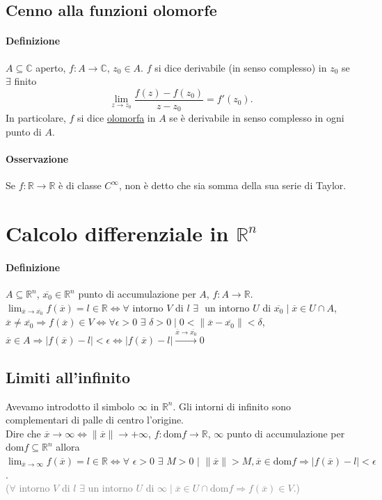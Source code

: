 \documentclass{article}
\newcommand{\R}{\mathbb{R}}
\newcommand{\C}{\mathbb{C}}
\newcommand{\dom}{\text{dom}}
\begin{document}
\subsection{{Cenno alla funzioni olomorfe}}

\paragraph{{Definizione}}
$A \subseteq \C$ aperto, $f:A\rightarrow \C$, $z_0\in A$. $f$ si dice derivabile (in senso complesso) in $z_0$ se $\exists$ finito 
\begin{equation*}
    \lim_{z \rightarrow z_0} \frac{f(z)-f(z_0)}{z-z_0}=f'(z_0).
\end{equation*}
In particolare, $f$ si dice \underline{olomorfa} in $A$ se è derivabile in senso complesso in ogni punto di $A$.

\paragraph{{Osservazione}}
Se $f:\R\rightarrow\R$ è di classe $C^\infty$, non è detto che sia somma della sua serie di Taylor.

\section{\Large\textbf{Calcolo differenziale in $\R^n$}}
\paragraph{Definizione}
$A \subseteq \R^n$, $\overline{x_0}\in \R^n$ punto di accumulazione per $A$, $f:A\rightarrow \R$. $ \lim_{\overline{x}\rightarrow\overline{x_0} }f(\overline{x})=l \in \R\Leftrightarrow \forall$ intorno $V$ di $l\,\, \exists\,\,$ un intorno $U$ di $\overline{x_0}\mid \overline{x}\in U \cap A$, $\overline{x}\neq \overline{x_0}\Rightarrow f(\overline{x})\in V \Leftrightarrow \forall \epsilon >0\,\, \exists\,\, \delta >0\mid 0 < \|\overline{x}-\overline{x_0} \| <\delta$, $\overline{x}\in A\Rightarrow |f(\overline{x})-l|< \epsilon \Leftrightarrow |f(\overline{x})-l|\xrightarrow{\overline{x}\rightarrow\overline{x_0}}0$

\subsection{{Limiti all'infinito}}
Avevamo introdotto il simbolo  $\infty$ in $\R^n$. Gli intorni di infinito sono complementari di palle di centro l'origine.\\
Dire che $\overline{x} \rightarrow \infty \Leftrightarrow \|\overline{x}\|\rightarrow +\infty$, $f:\dom f\rightarrow\R$, $\infty$ punto di accumulazione per $\dom f \subseteq \R^n$ allora $\lim_{\overline{x}\rightarrow \infty} f(\overline{x})=l\in \R \Leftrightarrow \forall \,\, \epsilon >0 \,\, \exists\,\, M >0 \,\, |\,\, \|\overline{x}\|>M, \overline{x}\in \dom f \Rightarrow |f(\overline{x})-l|<\epsilon$.\\
\textcolor{grey}{($\forall$ intorno $V$ di $l$ $\exists$ un intorno $U$ di $\infty \mid \overline{x}\in U \cap \dom f\Rightarrow f(\overline{x})\in V$.)}
\end{document}
